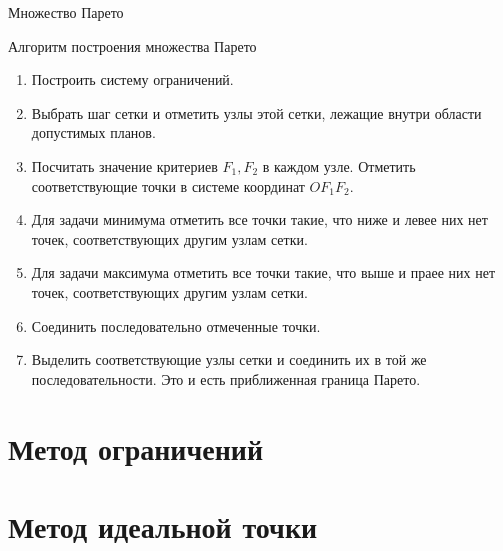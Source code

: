 \documentclass[unicode,11pt,notheorems,xcolor=table]{beamer}
\begin{document}
\begin{frame}{Множество Парето}
{\par}
\end{frame}



\begin{frame}{Алгоритм построения множества Парето }{}

    \begin{enumerate}
        \item Построить систему ограничений.
        \item Выбрать шаг сетки и отметить узлы этой сетки, лежащие внутри области допустимых планов.
        \item Посчитать значение критериев $F_1,F_2$ в каждом узле. Отметить соответствующие точки в системе координат $OF_1F_2$.
        \item Для задачи минимума отметить все точки такие, что ниже и левее них нет точек, соответствующих другим узлам сетки.
         \item Для задачи максимума отметить все точки такие, что выше и праее них нет точек, соответствующих другим узлам сетки.
         \item Соединить последовательно отмеченные точки.
         \item Выделить соответствующие узлы сетки и соединить их в той же последовательности. Это и есть приближенная граница Парето.
    \end{enumerate}
\end{frame}

\section{Метод ограничений}

\section{Метод идеальной точки}
\end{document}
